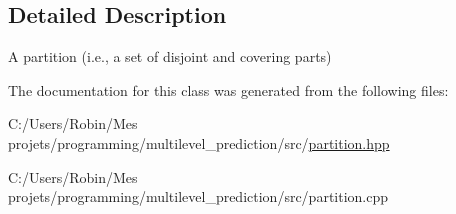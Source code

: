 \subsection{Detailed Description}
A partition (i.\+e., a set of disjoint and covering parts) 

The documentation for this class was generated from the following files\+:\begin{DoxyCompactItemize}
\item 
C\+:/\+Users/\+Robin/\+Mes projets/programming/multilevel\+\_\+prediction/src/\hyperlink{partition_8hpp}{partition.\+hpp}\item 
C\+:/\+Users/\+Robin/\+Mes projets/programming/multilevel\+\_\+prediction/src/partition.\+cpp\end{DoxyCompactItemize}
